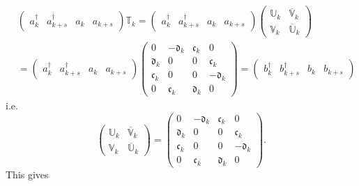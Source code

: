 \documentclass[aps, preprint]{revtex4}
\begin{document}
\begin{align} & \left (\begin{array}{cccc}a_{k}^{ \dag } & a_{k +s}^{ \dag } & a_{k} & a_{k +s}\end{array}\right ) \mathbb{T}_{k} =\left (\begin{array}{cccc}a_{k}^{ \dag } & a_{k +s}^{ \dag } & a_{k} & a_{k +s}\end{array}\right ) \left (\begin{array}{cc}\mathbb{U}_{k} & \overline{\mathbb{V}}_{k} \\
\mathbb{V}_{k} & \overline{\mathbb{U}}_{k}\end{array}\right ) \nonumber  \\
 &  =\left (\begin{array}{cccc}a_{k}^{ \dag } & a_{k +s}^{ \dag } & a_{k} & a_{k +s}\end{array}\right ) \left (\begin{array}{cccc}0 &  -\mathfrak{d}_{k} & \mathfrak{c}_{k} & 0 \\
\mathfrak{d}_{k} & 0 & 0 & \mathfrak{c}_{k} \\
\mathfrak{c}_{k} & 0 & 0 &  -\mathfrak{d}_{k} \\
0 & \mathfrak{c}_{k} & \mathfrak{d}_{k} & 0\end{array}\right ) =\left (\begin{array}{cccc}b_{k}^{ \dag } & b_{k +s}^{ \dag } & b_{k} & b_{k +s}\end{array}\right )\end{align}i.e.
\begin{equation}\left (\begin{array}{cc}\mathbb{U}_{k} & \overline{\mathbb{V}}_{k} \\
\mathbb{V}_{k} & \overline{\mathbb{U}}_{k}\end{array}\right ) =\left (\begin{array}{cccc}0 &  -\mathfrak{d}_{k} & \mathfrak{c}_{k} & 0 \\
\mathfrak{d}_{k} & 0 & 0 & \mathfrak{c}_{k} \\
\mathfrak{c}_{k} & 0 & 0 &  -\mathfrak{d}_{k} \\
0 & \mathfrak{c}_{k} & \mathfrak{d}_{k} & 0\end{array}\right )\text{.}
\end{equation}This gives
\end{document}

